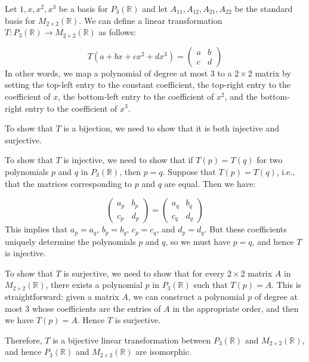 \documentclass[fontsize=12pt]{scrartcl}
\begin{document}
\noindent
Let ${1, x, x^2, x^3}$ be a basis for $P_3(\mathbb{R})$ and let ${A_{11}, A_{12}, A_{21}, A_{22}}$ be the standard basis for $M_{2 \times 2}(\mathbb{R})$. We can define a linear transformation $T: P_3(\mathbb{R}) \to M_{2 \times 2}(\mathbb{R})$ as follows:

$$T(a + bx+ cx^2 + dx^3) = \left(\begin{array}{cc} a & b \\ c & d \end{array} \right)$$
\noindent
In other words, we map a polynomial of degree at most 3 to a $2 \times 2$ matrix by setting the top-left entry to the constant coefficient, the top-right entry to the coefficient of $x$, the bottom-left entry to the coefficient of $x^2$, and the bottom-right entry to the coefficient of $x^3$.

\noindent
To show that $T$ is a bijection, we need to show that it is both injective and surjective.

\noindent
To show that $T$ is injective, we need to show that if $T(p) = T(q)$ for two polynomials $p$ and $q$ in $P_3(\mathbb{R})$, then $p=q$. Suppose that $T(p) = T(q)$, i.e., that the matrices corresponding to $p$ and $q$ are equal. Then we have:

$$ \left(\begin{array}{cc} a_p & b_p \\ c_p & d_p \end{array} \right) = \left(\begin{array}{cc} a_q & b_q \\ c_q & d_q \end{array} \right)$$
\noindent
This implies that $a_p = a_q$, $b_p = b_q$, $c_p = c_q$, and $d_p = d_q$. But these coefficients uniquely determine the polynomials $p$ and $q$, so we must have $p = q$, and hence $T$ is injective.

\noindent
To show that $T$ is surjective, we need to show that for every $2 \times 2$ matrix $A$ in $M_{2 \times 2}(\mathbb{R})$, there exists a polynomial $p$ in $P_3(\mathbb{R})$ such that $T(p) = A$. This is straightforward: given a matrix $A$, we can construct a polynomial $p$ of degree at most 3 whose coefficients are the entries of $A$ in the appropriate order, and then we have $T(p) = A$. Hence $T$ is surjective.

\noindent
Therefore, $T$ is a bijective linear transformation between $P_3(\mathbb{R})$ and $M_{2 \times 2}(\mathbb{R})$, and hence $P_3(\mathbb{R})$ and $M_{2 \times 2}(\mathbb{R})$ are isomorphic.
\\
\end{document}
